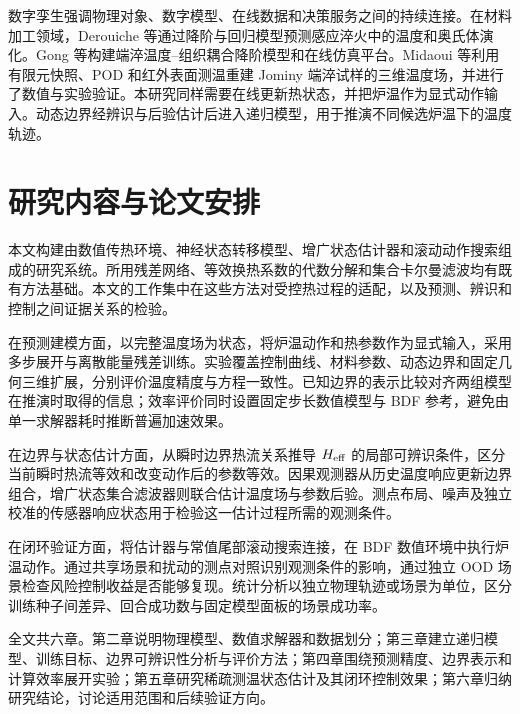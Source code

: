 数字孪生强调物理对象、数字模型、在线数据和决策服务之间的持续连接\cite{tao2018digitaltwin,stark2019digitaltwin}。在材料加工领域，Derouiche 等通过降阶与回归模型预测感应淬火中的温度和奥氏体演化\cite{derouiche2021induction}。Gong 等构建端淬温度--组织耦合降阶模型和在线仿真平台\cite{gong2026heatrom}。Midaoui 等利用有限元快照、POD 和红外表面测温重建 Jominy 端淬试样的三维温度场，并进行了数值与实验验证\cite{midaoui2026jominy}。本研究同样需要在线更新热状态，并把炉温作为显式动作输入。动态边界经辨识与后验估计后进入递归模型，用于推演不同候选炉温下的温度轨迹。

\section{研究内容与论文安排}

本文构建由数值传热环境、神经状态转移模型、增广状态估计器和滚动动作搜索组成的研究系统。所用残差网络、等效换热系数的代数分解和集合卡尔曼滤波均有既有方法基础。本文的工作集中在这些方法对受控热过程的适配，以及预测、辨识和控制之间证据关系的检验。

在预测建模方面，以完整温度场为状态，将炉温动作和热参数作为显式输入，采用多步展开与离散能量残差训练。实验覆盖控制曲线、材料参数、动态边界和固定几何三维扩展，分别评价温度精度与方程一致性。已知边界的表示比较对齐两组模型在推演时取得的信息；效率评价同时设置固定步长数值模型与 BDF 参考，避免由单一求解器耗时推断普遍加速效果。

在边界与状态估计方面，从瞬时边界热流关系推导 ${H_{\mathrm{eff}}}$ 的局部可辨识条件，区分当前瞬时热流等效和改变动作后的参数等效。因果观测器从历史温度响应更新边界组合，增广状态集合滤波器则联合估计温度场与参数后验。测点布局、噪声及独立校准的传感器响应状态用于检验这一估计过程所需的观测条件。

在闭环验证方面，将估计器与常值尾部滚动搜索连接，在 BDF 数值环境中执行炉温动作。通过共享场景和扰动的测点对照识别观测条件的影响，通过独立 OOD 场景检查风险控制收益是否能够复现。统计分析以独立物理轨迹或场景为单位，区分训练种子间差异、回合成功数与固定模型面板的场景成功率。

全文共六章。第二章说明物理模型、数值求解器和数据划分；第三章建立递归模型、训练目标、边界可辨识性分析与评价方法；第四章围绕预测精度、边界表示和计算效率展开实验；第五章研究稀疏测温状态估计及其闭环控制效果；第六章归纳研究结论，讨论适用范围和后续验证方向。
